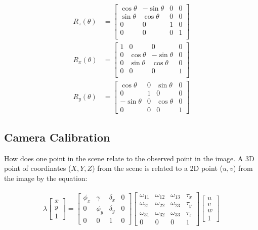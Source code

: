 \documentclass{article}
\begin{document}
\begin{align*}
	R_z(\theta) &= 
	\begin{bmatrix}
		\cos\theta & -\sin\theta & 0 & 0 \\
		\sin\theta & \cos\theta & 0 & 0 \\
		0 & 0 & 1 & 0 \\
		0 & 0 & 0 & 1 \\
	\end{bmatrix} \\
	R_x(\theta) &= 
	\begin{bmatrix}
		1 & 0 & 0 & 0 \\
		0 & \cos\theta & -\sin\theta & 0 \\
		0 & \sin\theta & \cos\theta & 0 \\
		0 & 0 & 0 & 1 \\
	\end{bmatrix} \\
	R_y(\theta) &=
	\begin{bmatrix}
		\cos\theta & 0 & \sin\theta & 0 \\
		0 & 1 & 0 & 0 \\
		-\sin\theta & 0 & \cos\theta & 0 \\
		0 & 0 & 0 & 1
	\end{bmatrix}
\end{align*}
\subsection{Camera Calibration}
How does one point in the scene relate to the observed point in the image.
A 3D point of coordinates ($X,Y,Z$) from the scene is related to a 2D point ($u,v$) from the image by the equation:

\begin{align*}
\lambda \begin{bmatrix}x \\ y \\ 1\end{bmatrix}
=
\begin{bmatrix}
	\phi_x & \gamma & \delta_x & 0\\
	0 & \phi_y & \delta_y & 0\\
	0 & 0 & 1 & 0
\end{bmatrix}
	\begin{bmatrix}
		\omega_{11} & \omega_{12} & \omega_{13} & \tau_x \\
		\omega_{21} & \omega_{22} & \omega_{23} & \tau_y \\
		\omega_{31} & \omega_{32} & \omega_{33} & \tau_z \\
		0 & 0 & 0 & 1
	\end{bmatrix}
	\begin{bmatrix}u \\ v \\ w \\ 1	\end{bmatrix}
\end{align*}
\end{document}
